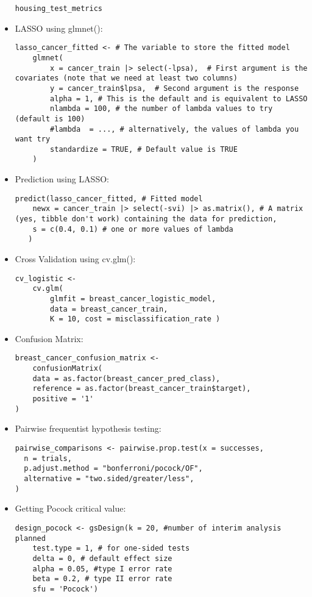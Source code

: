 \documentclass[8pt,landscape,a4paper, fleqn, dvipsnames]{extarticle}
\begin{document}
\begin{multicols*}{4}
\begin{itemize}
\begin{lstlisting}
housing_test_metrics
    \end{lstlisting}
    \item LASSO using glmnet():
    \begin{lstlisting}
lasso_cancer_fitted <- # The variable to store the fitted model
    glmnet(
        x = cancer_train |> select(-lpsa),  # First argument is the covariates (note that we need at least two columns)
        y = cancer_train$lpsa,  # Second argument is the response
        alpha = 1, # This is the default and is equivalent to LASSO 
        nlambda = 100, # the number of lambda values to try (default is 100)
        #lambda  = ..., # alternatively, the values of lambda you want try
        standardize = TRUE, # Default value is TRUE
    )
    \end{lstlisting}
    \item Prediction using LASSO:
    \begin{lstlisting}
predict(lasso_cancer_fitted, # Fitted model
    newx = cancer_train |> select(-svi) |> as.matrix(), # A matrix (yes, tibble don't work) containing the data for prediction,
    s = c(0.4, 0.1) # one or more values of lambda
   ) 
    \end{lstlisting}
    \item Cross Validation using cv.glm():
    \begin{lstlisting}
cv_logistic <- 
    cv.glm(
        glmfit = breast_cancer_logistic_model, 
        data = breast_cancer_train, 
        K = 10, cost = misclassification_rate )
    \end{lstlisting}
    \item Confusion Matrix:
    \begin{lstlisting}
breast_cancer_confusion_matrix <- 
    confusionMatrix(
    data = as.factor(breast_cancer_pred_class),
    reference = as.factor(breast_cancer_train$target),
    positive = '1'
)
    \end{lstlisting}
    \item Pairwise frequentist hypothesis testing:
    \begin{lstlisting}
pairwise_comparisons <- pairwise.prop.test(x = successes,
  n = trials,
  p.adjust.method = "bonferroni/pocock/OF", 
  alternative = "two.sided/greater/less",
)
    \end{lstlisting}
    \item Getting Pocock critical value:
    \begin{lstlisting}
design_pocock <- gsDesign(k = 20, #number of interim analysis planned
    test.type = 1, # for one-sided tests
    delta = 0, # default effect size
    alpha = 0.05, #type I error rate
    beta = 0.2, # type II error rate
    sfu = 'Pocock')
                          

\end{lstlisting}
\end{itemize}
\end{multicols*}
\end{document}
